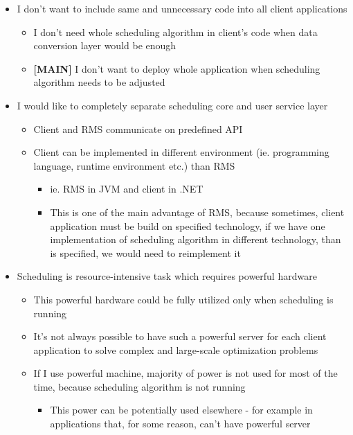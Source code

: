 \begin{itemize}
    \item I don't want to include same and unnecessary code into all client applications
    \begin{itemize}
        \item I don't need whole scheduling algorithm in client's code when data conversion layer would be enough
        \item \textbf{[MAIN]} I don't want to deploy whole application when scheduling algorithm needs to be adjusted
    \end{itemize}
    \item I would like to completely separate scheduling core and user service layer
    \begin{itemize}
        \item Client and RMS communicate on predefined API
        \item Client can be implemented in different environment (ie.
        programming language, runtime environment etc.) than RMS
        \begin{itemize}
            \item ie.
            RMS in JVM and client in .NET
            \item This is one of the main advantage of RMS, because sometimes, client application must be build on specified technology, if we have
            one implementation of scheduling algorithm in different technology, than is specified, we would need to reimplement it
        \end{itemize}
    \end{itemize}
    \item Scheduling is resource-intensive task which requires powerful hardware
    \begin{itemize}
        \item This powerful hardware could be fully utilized only when scheduling is running
        \item It's not always possible to have such a powerful server for each client application to solve complex and large-scale optimization problems
        \item If I use powerful machine, majority of power is not used for most of the time, because scheduling algorithm is not running
        \begin{itemize}
            \item This power can be potentially used elsewhere - for example in applications that, for some reason, can't have powerful server

\end{itemize}
\end{itemize}
\end{itemize}
